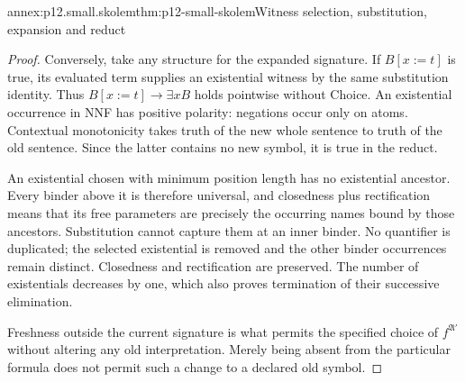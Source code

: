 \begin{annexitem}{annex:p12.small.skolem}{thm:p12-small-skolem}{Witness selection, substitution, expansion and reduct}
\begin{proof}
Conversely, take any structure for the expanded signature. If
\(B[x:=t]\) is true, its evaluated term supplies an existential
witness by the same substitution identity. Thus
\(B[x:=t]\to\exists x B\) holds pointwise without Choice.
An existential occurrence in NNF has positive polarity: negations
occur only on atoms. Contextual monotonicity takes truth of the
new whole sentence to truth of the old sentence. Since the latter
contains no new symbol, it is true in the reduct.

An existential chosen with minimum position length has no
existential ancestor. Every binder above it is therefore universal,
and closedness plus rectification means that its free parameters
are precisely the occurring names bound by those ancestors.
Substitution cannot capture them at an inner binder. No quantifier
is duplicated; the selected existential is removed and the other
binder occurrences remain distinct. Closedness and rectification
are preserved. The number of existentials decreases by one,
which also proves termination of their successive elimination.

Freshness outside the current signature is what permits the
specified choice of \(f^{\mathfrak A'}\) without altering any old
interpretation. Merely being absent from the particular formula
does not permit such a change to a declared old symbol.
\end{proof}
\end{annexitem}

